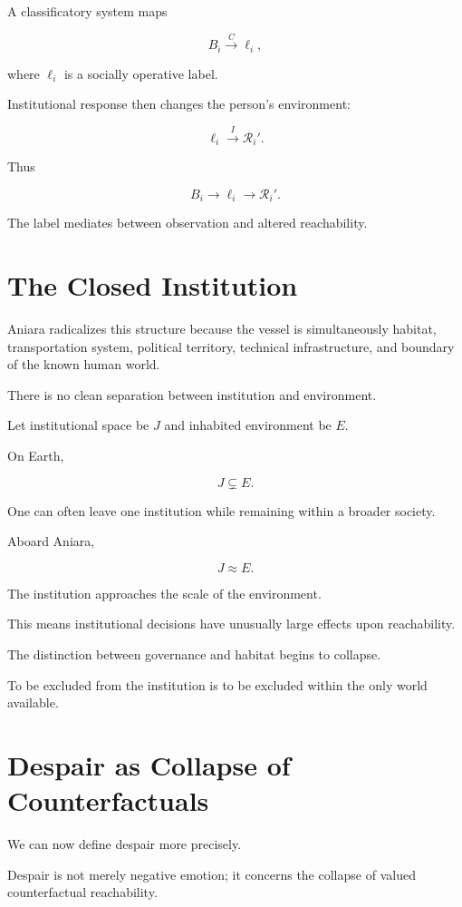\documentclass[11pt,oneside]{book}
\theoremstyle{definition}
\theoremstyle{remark}
\newcommand{\R}{\mathcal{R}}
\begin{document}
A classificatory system maps

\[
B_i
\xrightarrow{C}
\ell_i,
\]

where \(\ell_i\) is a socially operative label.

Institutional response then changes the person's environment:

\[
\ell_i
\xrightarrow{I}
\R_i'.
\]

Thus

\[
B_i
\rightarrow
\ell_i
\rightarrow
\R_i'.
\]

The label mediates between observation and altered reachability.

\section{The Closed Institution}

Aniara radicalizes this structure because the vessel is simultaneously habitat, transportation system, political territory, technical infrastructure, and boundary of the known human world.

There is no clean separation between institution and environment.

Let institutional space be \(J\) and inhabited environment be \(E\).

On Earth,

\[
J\subsetneq E.
\]

One can often leave one institution while remaining within a broader society.

Aboard Aniara,

\[
J\approx E.
\]

The institution approaches the scale of the environment.

This means institutional decisions have unusually large effects upon reachability.

The distinction between governance and habitat begins to collapse.

To be excluded from the institution is to be excluded within the only world available.

\section{Despair as Collapse of Counterfactuals}

We can now define despair more precisely.

Despair is not merely negative emotion; it concerns the collapse of valued counterfactual reachability.
\end{document}
